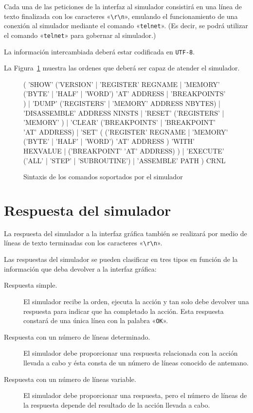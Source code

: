 \documentclass[notitlepage,11pt,a4paper,final,twoside]{article}
\begin{document}
Cada una de las peticiones de la interfaz al simulador consistirá en
una línea de texto finalizada con los caracteres «\verb|\r\n|»,
emulando el funcionamiento de una conexión al simulador mediante el
comando «\verb+telnet+». (Es decir, se podrá utilizar el comando
«\verb|telnet|» para gobernar al simulador.)

La información intercambiada deberá estar codificada en
\texttt{UTF-8}.

La Figura~\ref{fig:ordenes} muestra las ordenes que deberá ser capaz
de atender el simulador.

\begin{figure}[htbp]
  \centering
  \begin{rail}
  (
    'SHOW' ('VERSION' | 'REGISTER' REGNAME
                      | 'MEMORY' ('BYTE' | 'HALF' | 'WORD') 'AT' ADDRESS 
                      | 'BREAKPOINTS' ) |
    'DUMP' ('REGISTERS' | 'MEMORY' ADDRESS NBYTES) |
    'DISASSEMBLE' ADDRESS NINSTS |
    'RESET' ('REGISTERS' | 'MEMORY' ) |
    'CLEAR' ('BREAKPOINTS' | 'BREAKPOINT' 'AT' ADDRESS) |
    'SET'  (
             ('REGISTER' REGNAME |
              'MEMORY' ('BYTE' | 'HALF' | 'WORD') 'AT' ADDRESS ) 'WITH' HEXVALUE | 
             ('BREAKPOINT' 'AT' ADDRESS)
           ) |
    'EXECUTE' ('ALL' | 'STEP' | 'SUBROUTINE') |
    'ASSEMBLE' PATH
  ) CRNL
  \end{rail}
  \caption{Sintaxis de los comandos soportados por el simulador}
  \label{fig:ordenes}
\end{figure}

\section{Respuesta del simulador}

La respuesta del simulador a la interfaz gráfica también se realizará
por medio de líneas de texto terminadas con los caracteres
«\verb|\r\n|».

Las respuestas del simulador se pueden clasificar en tres tipos en
función de la información que deba devolver a la interfaz gráfica:
\begin{description}
\item[Respuesta simple.] El simulador recibe la orden, ejecuta la
  acción y tan solo debe devolver una respuesta para indicar que ha
  completado la acción. Esta respuesta constará de una única línea con
  la palabra «\texttt{OK}».
\item[Respuesta con un número de líneas determinado.] El simulador
  debe proporcionar una respuesta relacionada con la acción llevada a
  cabo y ésta consta de un número de líneas conocido de antemano.
\item[Respuesta con un número de líneas variable.] El simulador debe
  proporcionar una respuesta, pero el número de líneas de la respuesta
  depende del resultado de la acción llevada a cabo.
\end{description}
\end{document}
